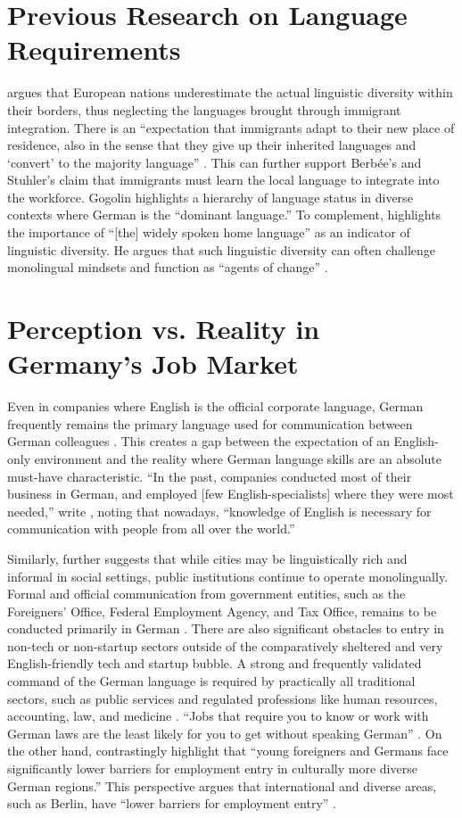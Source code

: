 \section{Previous Research on Language Requirements}
\citet{gogolin02} argues that European nations underestimate the actual linguistic diversity within their borders, thus neglecting the languages brought through immigrant integration. There is an “expectation that immigrants adapt to their new place of residence, also in the sense that they give up their inherited languages and ‘convert’ to the majority language” \citep{gogolin02}. This can further support Berbée’s and Stuhler’s claim that immigrants must learn the local language to integrate into the workforce. Gogolin highlights a hierarchy of language status in diverse contexts where German is the “dominant language.” To complement, \citet{Extra10diversity} highlights the importance of “[the] widely spoken home language” as an indicator of linguistic diversity. He argues that such linguistic diversity can often challenge monolingual mindsets and function as “agents of change” \citep{Extra10diversity}.


\section{Perception vs. Reality in Germany's Job Market}
Even in companies where English is the official corporate language, German frequently remains the primary language used for communication between German colleagues \citep{ErlingWalton07}. This creates a gap between the expectation of an English-only environment and the reality where German language skills are an absolute must-have characteristic. “In the past, companies conducted most of their business in German, and employed [few English-specialists] where they were most needed,” write \citet{ErlingWalton07}, noting that nowadays, “knowledge of English is necessary for communication with people from all over the world.”

Similarly, \citet{Extra10diversity} further suggests that while cities may be linguistically rich and informal in social settings, public institutions continue to operate monolingually.  Formal and official communication from government entities, such as the Foreigners’ Office, Federal Employment Agency, and Tax Office, remains to be conducted primarily in German \citep{kummuni25Language}. There are also significant obstacles to entry in non-tech or non-startup sectors outside of the comparatively sheltered and very English-friendly tech and startup bubble. A strong and frequently validated command of the German language is required by practically all traditional sectors, such as public services and regulated professions like human resources, accounting, law, and medicine \citep{simplegermany25}. “Jobs that require you to know or work with German laws are the least likely for you to get without speaking German” \citep{simplegermany25}. On the other hand, \citet{DamelangHaas12} contrastingly highlight that “young foreigners and Germans face significantly lower barriers for employment entry in culturally more diverse German regions.” This perspective argues that international and diverse areas, such as Berlin, have “lower barriers for employment entry” \citep{DamelangHaas12}.
